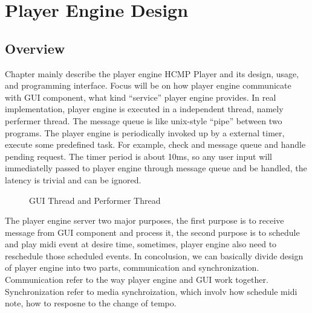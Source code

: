 
\chapter{Player Engine Design} %



\ifpdf
    \graphicspath{{X/figures/PNG/}{X/figures/PDF/}{X/figures/}}
\else
    \graphicspath{{X/figures/EPS/}{X/figures/}}
\fi

\section{Overview}
Chapter mainly describe the player engine HCMP Player and its design, usage,
and programming interface. Focus will be on how player engine communicate 
with GUI component, what kind  
``service'' player engine provides. In real implementation, player engine is 
executed in a independent thread, namely perfermer thread. The message queue 
is like unix-style ``pipe'' between 
two programs. The player engine is periodically invoked up by a external timer, 
execute some predefined task. For example, check and message queue and handle 
pending request. The timer period is about 10ms, so any user 
input will immediatelly passed to player engine through message queue and 
be handled, the latency is trivial and can be ignored.

\begin{figure}[H]
\caption{GUI Thread and Performer Thread}
\label{fig:speciation}
\end{figure}

The player engine server two major purposes, the first purpose is to receive 
message from GUI component and process it, the second purpose is to schedule 
and play midi event at desire time, sometimes, player engine also need to 
reschedule those scheduled events. In concolusion, we can basically divide 
design of player engine  
into two parts, communication and synchronization. Communication refer to the 
way player engine and GUI work together. Synchronization refer to
media synchroization, which involv how schedule midi note, how to resposne to
the change of tempo. 

